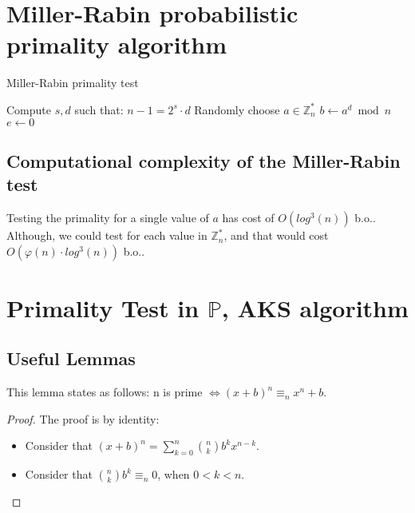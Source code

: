 \section{Miller-Rabin probabilistic primality algorithm}
\begin{algorithm}
\caption{Miller-Rabin primality test}\label{alg:miller_rabin_ptest}
Compute $s, d$ such that: $n - 1 = 2^{s} \cdot d$\;
Randomly choose $a \in \mathbb{Z}_{n}^{*}$\;
$b \gets a^{d} \bmod n$\;
$e \gets 0$\;
\;
\end{algorithm}
\subsection{Computational complexity of the Miller-Rabin test}
Testing the primality for a single value of $a$ has cost of $O(log^{3}(n))$ b.o.. Although, we could test for each value in $\mathbb{Z}_{n}^{*}$, and that would cost $O(\varphi(n) \cdot log^{3}(n))$ b.o..

\section{Primality Test in $\mathbb{P}$, AKS algorithm}
\subsection{Useful Lemmas}
\begin{lemma}\label{newtown_form_lemma}
    This lemma states as follows:\newline
    n is prime $\iff (x + b)^{n} \equiv_{n} x^{n} + b$.
\end{lemma}
\begin{proof}
    The proof is by identity:
    \begin{itemize}
        \item Consider that $(x + b)^{n} = \sum_{k=0}^{n} \binom{n}{k} b^{k}x^{n-k}$.
        \item Consider that $\binom{n}{k} b^{k} \equiv_{n} 0$, when $0 < k < n$.
    \end{itemize}
\end{proof}

